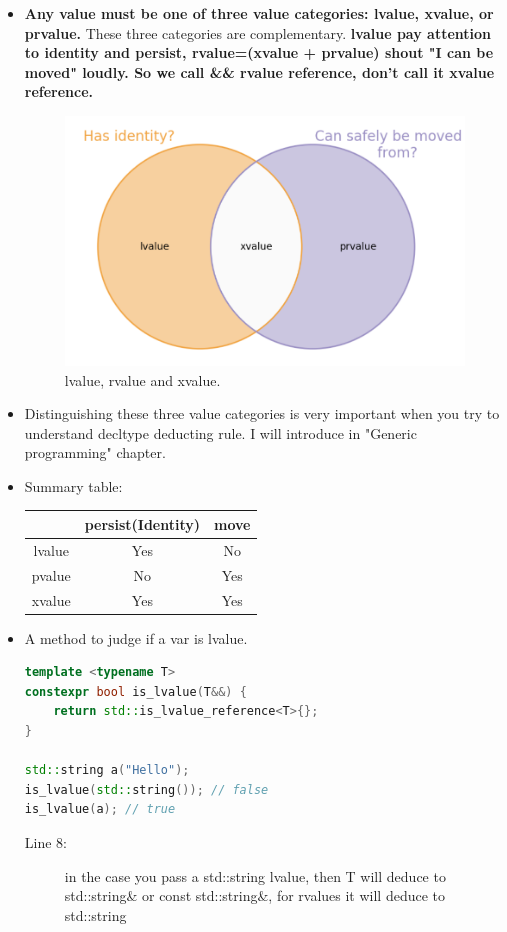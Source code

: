 \documentclass[a4paper,11pt,twoside]{book}
\newcommand{\tophline}{\hline }
\newcommand{\bottomhline}{\\ \hline }
\newcommand{\tophline}{ }
\newcommand{\bottomhline}{ }
\begin{document}
\begin{itemize}
	\item \textbf{Any value must be one of three value categories: lvalue, xvalue, or prvalue.} These three categories are complementary.  \textbf{lvalue pay attention to  identity and persist, rvalue=(xvalue + prvalue) shout "I can be moved" loudly.  So we call \&\& rvalue reference, don't call it xvalue reference. }
	
	\begin{figure}[h]
		\centering
		\includegraphics[width=0.4\linewidth]{pics/xvalue1.png}
		\caption{lvalue, rvalue and xvalue.}
		\label{fig:xvalue1}
	\end{figure}
	
	
	\item Distinguishing these three value categories is very important when you try to understand decltype deducting rule. I will introduce in "Generic programming" chapter.
	
	\item Summary table: 
	\begin{center}
		\begin{tabular}{|c|c|c|}
			\tophline
			& persist(Identity) & move \\
			\tophline
			lvalue & Yes & No \\
			\tophline
			pvalue & No & Yes \\
			\tophline
			xvalue & Yes & Yes \bottomhline
		\end{tabular}
	\end{center}
	



\item A method to judge if a var is lvalue.
\begin{lstlisting}[frame=single, language=c++]
template <typename T>
constexpr bool is_lvalue(T&&) {
	return std::is_lvalue_reference<T>{};
}

std::string a("Hello");
is_lvalue(std::string()); // false
is_lvalue(a); // true  
\end{lstlisting}

\begin{description}
	\item[Line 8:] in the case you pass a std::string lvalue, then T will deduce to std::string\& or const std::string\&, for rvalues it will deduce to std::string
\end{description}


\end{itemize}
\end{document}
